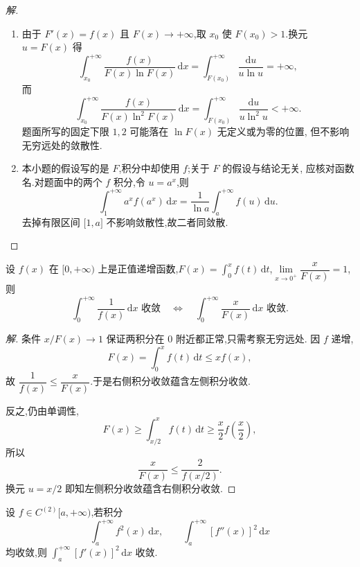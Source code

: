 \documentclass[../../数学分析培优讲义(答案版).tex]{subfiles}
\begin{document}
\begin{proof}[解]
\begin{enumerate}[label=(\arabic*)]
    \item 由于 $F'(x)=f(x)$ 且 $F(x)\to+\infty$,取 $x_0$ 使
    $F(x_0)>1$.换元 $u=F(x)$ 得
    \[
        \int_{x_0}^{+\infty}\dfrac{f(x)}{F(x)\ln F(x)}\,\mathrm{d}x
        =\int_{F(x_0)}^{+\infty}\dfrac{\mathrm{d}u}{u\ln u}=+\infty,
    \]
    而
    \[
        \int_{x_0}^{+\infty}\dfrac{f(x)}{F(x)\ln^2F(x)}\,\mathrm{d}x
        =\int_{F(x_0)}^{+\infty}\dfrac{\mathrm{d}u}{u\ln^2u}<+\infty.
    \]
    题面所写的固定下限 $1,2$ 可能落在 $\ln F(x)$ 无定义或为零的位置,
    但不影响无穷远处的敛散性.

    \item 本小题的假设写的是 $F$,积分中却使用 $f$;关于 $F$ 的假设与结论无关,
    应核对函数名.对题面中的两个 $f$ 积分,令 $u=a^x$,则
    \[
        \int_1^{+\infty}a^xf(a^x)\,\mathrm{d}x
        =\dfrac{1}{\ln a}\int_a^{+\infty}f(u)\,\mathrm{d}u.
    \]
    去掉有限区间 $\lbrack1,a\rbrack$ 不影响敛散性,故二者同敛散.
\end{enumerate}
\end{proof}

\begin{example}
设 $f(x)$ 在 $\lbrack 0,+\infty)$ 上是正值递增函数,$\displaystyle F(x)=\int_0^xf(t)\,\mathrm{d}t$,$\displaystyle\lim\limits_{x\to0^+}\dfrac{x}{F(x)}=1$,则
\[
    \int_0^{+\infty}\dfrac{1}{f(x)}\,\mathrm{d}x\text{ 收敛}
    \quad\Longleftrightarrow\quad
    \int_0^{+\infty}\dfrac{x}{F(x)}\,\mathrm{d}x\text{ 收敛}.
\]
\end{example}

\begin{proof}[解]
条件 $x/F(x)\to1$ 保证两积分在 $0$ 附近都正常,只需考察无穷远处.
因 $f$ 递增,
\[
    F(x)=\int_0^xf(t)\,\mathrm{d}t\leq xf(x),
\]
故 $\dfrac{1}{f(x)}\leq\dfrac{x}{F(x)}$.于是右侧积分收敛蕴含左侧积分收敛.

反之,仍由单调性,
\[
    F(x)\geq\int_{x/2}^xf(t)\,\mathrm{d}t\geq\dfrac{x}{2}f\left(\dfrac{x}{2}\right),
\]
所以
\[
    \dfrac{x}{F(x)}\leq\dfrac{2}{f(x/2)}.
\]
换元 $u=x/2$ 即知左侧积分收敛蕴含右侧积分收敛.
\end{proof}

\begin{example}
设 $f\in C^{(2)}\lbrack a,+\infty)$,若积分
\[
    \int_a^{+\infty}f^2(x)\,\mathrm{d}x,
    \qquad
    \int_a^{+\infty}[f''(x)]^2\,\mathrm{d}x
\]
均收敛,则 $\displaystyle\int_a^{+\infty}[f'(x)]^2\,\mathrm{d}x$ 收敛.
\end{example}
\end{document}
